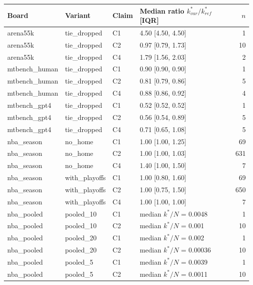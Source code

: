 {\footnotesize\setlength{\tabcolsep}{3pt}
\begin{tabular}{llllr}
\toprule
Board & Variant & Claim & Median ratio $k^*_{var}/k^*_{ref}$ [IQR] & $n$ \\
\midrule
arena55k & tie\_dropped & C1 & 4.50 [4.50, 4.50] & 1 \\
arena55k & tie\_dropped & C2 & 0.97 [0.79, 1.73] & 10 \\
arena55k & tie\_dropped & C4 & 1.79 [1.56, 2.03] & 2 \\
mtbench\_human & tie\_dropped & C1 & 0.90 [0.90, 0.90] & 1 \\
mtbench\_human & tie\_dropped & C2 & 0.81 [0.79, 0.86] & 5 \\
mtbench\_human & tie\_dropped & C4 & 0.88 [0.86, 0.92] & 4 \\
mtbench\_gpt4 & tie\_dropped & C1 & 0.52 [0.52, 0.52] & 1 \\
mtbench\_gpt4 & tie\_dropped & C2 & 0.56 [0.54, 0.89] & 5 \\
mtbench\_gpt4 & tie\_dropped & C4 & 0.71 [0.65, 1.08] & 5 \\
nba\_season & no\_home & C1 & 1.00 [1.00, 1.25] & 69 \\
nba\_season & no\_home & C2 & 1.00 [1.00, 1.03] & 631 \\
nba\_season & no\_home & C4 & 1.40 [1.00, 1.50] & 7 \\
nba\_season & with\_playoffs & C1 & 1.00 [0.80, 1.60] & 69 \\
nba\_season & with\_playoffs & C2 & 1.00 [0.75, 1.50] & 650 \\
nba\_season & with\_playoffs & C4 & 1.00 [1.00, 1.00] & 7 \\
nba\_pooled & pooled\_10 & C1 & median $k^*/N$ = 0.0048 & 1 \\
nba\_pooled & pooled\_10 & C2 & median $k^*/N$ = 0.001 & 10 \\
nba\_pooled & pooled\_20 & C1 & median $k^*/N$ = 0.002 & 1 \\
nba\_pooled & pooled\_20 & C2 & median $k^*/N$ = 0.00036 & 10 \\
nba\_pooled & pooled\_5 & C1 & median $k^*/N$ = 0.0039 & 1 \\
nba\_pooled & pooled\_5 & C2 & median $k^*/N$ = 0.0011 & 10 \\
\bottomrule
\end{tabular}
}
